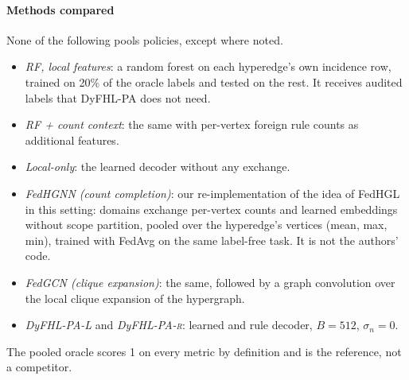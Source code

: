 \documentclass[preprint,12pt]{elsarticle}
\theoremstyle{definition}
\newcommand{\name}{DyFHL-PA\xspace}
\newcommand{\R}{\textsc{r}}
\begin{document}
\begin{table}[t]
\caption{Benchmark statistics (means over seeds). Prevalence is the fraction of positive labels per task.}
\label{tab:data}
\centering\footnotesize
{}
\end{table}

\paragraph{Methods compared} None of the following pools policies, except where noted.
\begin{itemize}
\item \emph{RF, local features}: a random forest on each hyperedge's own incidence row, trained on 20\% of the oracle labels and tested on the rest. It receives audited labels that \name does not need.
\item \emph{RF + count context}: the same with per-vertex foreign rule counts as additional features.
\item \emph{Local-only}: the learned decoder without any exchange.
\item \emph{FedHGNN (count completion)}: our re-implementation of the idea of FedHGL~\cite{luo2024fedhgl} in this setting: domains exchange per-vertex counts and learned embeddings without scope partition, pooled over the hyperedge's vertices (mean, max, min), trained with FedAvg on the same label-free task. It is not the authors' code.
\item \emph{FedGCN (clique expansion)}: the same, followed by a graph convolution over the local clique expansion of the hypergraph.
\item \emph{\name-L} and \emph{\name-\R}: learned and rule decoder, $B=512$, $\sigma_{\!n}=0$.
\end{itemize}
The pooled oracle scores 1 on every metric by definition and is the reference, not a competitor.
\end{document}
